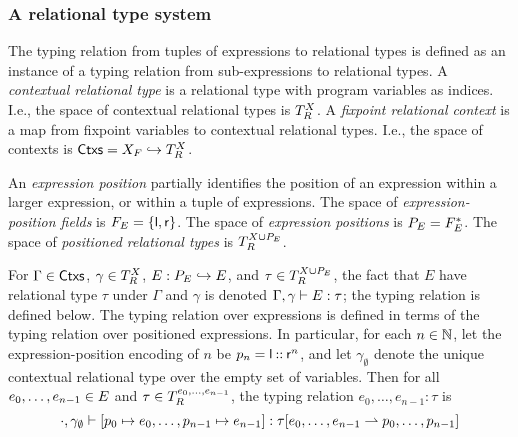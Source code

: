

\subsubsection{A relational type system}
\label{sec:rel-type-sys}
%
The typing relation from tuples of expressions to relational types is
defined as an instance of a typing relation from sub-expressions to
relational types.
A \emph{contextual relational type} is a relational type with program
variables as indices.
%
I.e., the space of contextual relational types is $T_{R}^{X}$.
%
A \emph{fixpoint relational context} is a map from fixpoint variables
to contextual relational types.
%
I.e., the space of contexts is
$\mathsf{Ctxs} = X_F \hookrightarrow T_R^{X}$.

An \emph{expression position} partially identifies the position of an
expression within a larger expression, or within a tuple of
expressions.
%
The space of \emph{expression-position fields} is
$F_E = \{  \mathsf{l}, \mathsf{r}  \}$.
%
The space of \emph{expression positions} is
$P_E = F_E^{*}$.
% 
The space of \emph{positioned relational types} is
$T_{R}^{X \cup P_E}$.

For $\Gamma \in \mathsf{Ctxs}$, $\gamma \in T_R^{X}$,
$E : P_E \hookrightarrow E$, and $\tau \in T_R^{X \cup P_E}$, the fact
that $E$ have relational type $\tau$ under $\Gamma$ and $\gamma$ is
denoted $\Gamma, \gamma \vdash E : \tau$;
%
the typing relation is defined below.
%
The typing relation over expressions is defined in terms of the typing
relation over positioned expressions.
%
In particular, for each $n \in \mathbb{N}$, let the expression-position
encoding of $n$ be $p_{n} = \mathsf{l} \mathbin{::} \mathsf{r}^{n}$, and
let $\gamma_{\emptyset}$ denote the unique contextual relational type
over the empty set of variables.
%
Then for all $e_0, \ldots, e_{n - 1} \in E$ and
$\tau \in T_{R}^{ e_0, \ldots, e_{n - 1} }$, the typing relation
$e_0, \ldots, e_{n - 1} : \tau$ is
\[ \cdot, \gamma_{\emptyset} \vdash [ p_{0} \mapsto e_0, \ldots,
  p_{n - 1} \mapsto e_{n - 1} ] :  \tau [  e_0, \ldots,
    e_{n - 1}  \rightharpoonup  p_{0}, \ldots, p_{n - 1}  ] \]

